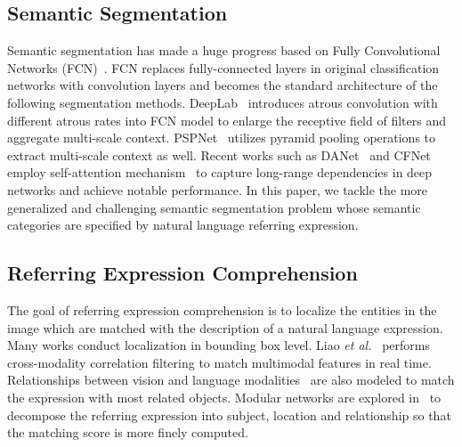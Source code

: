 \documentclass[10pt,twocolumn,letterpaper]{article}
\begin{document}
\subsection{Semantic Segmentation}
Semantic segmentation has made a huge progress based on 
Fully Convolutional Networks (FCN)~\cite{long2015fully}. 
FCN replaces fully-connected layers in original classification 
networks with convolution layers and becomes the standard 
architecture of the following segmentation methods. 
DeepLab~\cite{chen2014semantic}\cite{chen2017deeplab}\cite{chen2017rethinking} 
introduces atrous convolution with different atrous rates into FCN 
model to enlarge the receptive field of filters and aggregate multi-scale context. 
PSPNet~\cite{zhao2017pyramid} utilizes pyramid pooling operations to extract 
multi-scale context as well. Recent works such as DANet~\cite{fu2019dual} and 
CFNet~\cite{zhang2019co} employ self-attention mechanism~\cite{wang2018non} to 
capture long-range dependencies in deep networks and achieve notable performance. 
In this paper, we tackle the more generalized and challenging semantic segmentation 
problem whose semantic categories are specified by natural language referring expression.

\subsection{Referring Expression Comprehension}
The goal of referring expression comprehension is to localize the entities in the image 
which are matched with the description of a natural language expression. Many works 
conduct localization in bounding box level. 
Liao \textit{et al.}~\cite{liao2019real} performs cross-modality correlation filtering to match multimodal features in real time. 
Relationships between vision and language modalities~\cite{hu2017modeling}\cite{yang2019cross} 
are also modeled to match the expression with most related objects. Modular networks are 
explored in~\cite{yu2018mattnet} to decompose the referring expression into subject, location 
and relationship so that the matching score is more finely computed. 
\end{document}

